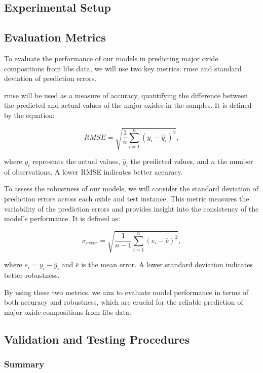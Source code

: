 \subsection{Experimental Setup}

\subsection{Evaluation Metrics}
To evaluate the performance of our models in predicting major oxide compositions from \gls{libs} data, we will use two key metrics: \gls{rmse} and standard deviation of prediction errors.

\gls{rmse} will be used as a measure of accuracy, quantifying the difference between the predicted and actual values of the major oxides in the samples. It is defined by the equation:

\begin{equation}
    RMSE = \sqrt{\frac{1}{n} \sum_{i=1}^{n} (y_i - \hat{y}_i)^2},
\end{equation}

where $y_i$ represents the actual values, $\hat{y}_i$ the predicted values, and $n$ the number of observations. A lower RMSE indicates better accuracy.

To assess the robustness of our models, we will consider the standard deviation of prediction errors across each oxide and test instance. This metric measures the variability of the prediction errors and provides insight into the consistency of the model's performance. It is defined as:

\begin{equation}
    \sigma_{error} = \sqrt{\frac{1}{n-1} \sum_{i=1}^{n} (e_i - \bar{e})^2},
\end{equation}

where $e_i = y_i - \hat{y}_i$ and $\bar{e}$ is the mean error. A lower standard deviation indicates better robustness.

By using these two metrics, we aim to evaluate model performance in terms of both accuracy and robustness, which are crucial for the reliable prediction of major oxide compositions from \gls{libs} data.

\subsection{Validation and Testing Procedures}


\subsubsection{Summary}

